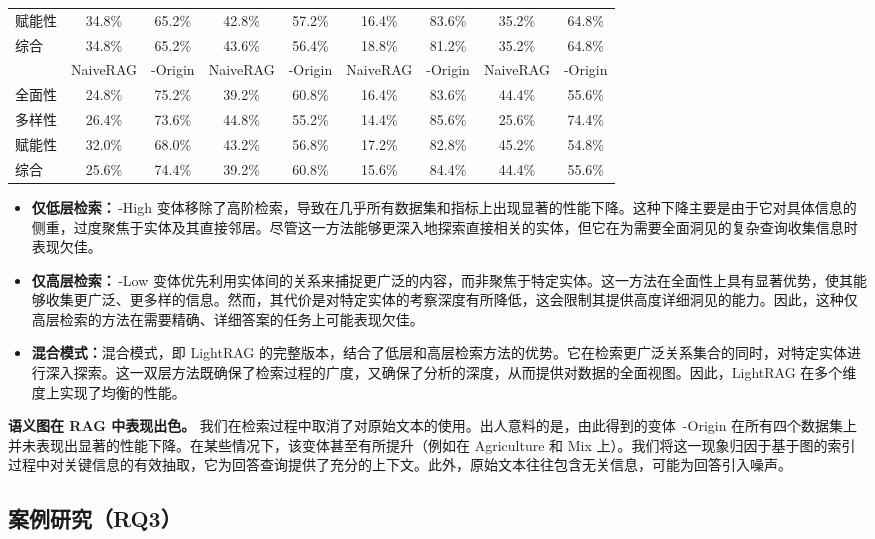 \documentclass[11pt,UTF8,fontset=fandol]{ctexart}
\begin{document}
\begin{table}[H]
\begin{tabular}{lcccccccc}
赋能性 & 34.8\% & 65.2\% & 42.8\% & 57.2\% & 16.4\% & 83.6\% & 35.2\% & 64.8\% \\
综合 & 34.8\% & 65.2\% & 43.6\% & 56.4\% & 18.8\% & 81.2\% & 35.2\% & 64.8\% \\
\midrule
& NaiveRAG & -Origin & NaiveRAG & -Origin & NaiveRAG & -Origin & NaiveRAG & -Origin \\
\midrule
全面性 & 24.8\% & 75.2\% & 39.2\% & 60.8\% & 16.4\% & 83.6\% & 44.4\% & 55.6\% \\
多样性 & 26.4\% & 73.6\% & 44.8\% & 55.2\% & 14.4\% & 85.6\% & 25.6\% & 74.4\% \\
赋能性 & 32.0\% & 68.0\% & 43.2\% & 56.8\% & 17.2\% & 82.8\% & 45.2\% & 54.8\% \\
综合 & 25.6\% & 74.4\% & 39.2\% & 60.8\% & 15.6\% & 84.4\% & 44.4\% & 55.6\% \\
\bottomrule
\end{tabular}
\end{table}

\begin{itemize}[leftmargin=1.5em]
\item \textbf{仅低层检索：}\,-High 变体移除了高阶检索，导致在几乎所有数据集和指标上出现显著的性能下降。这种下降主要是由于它对具体信息的侧重，过度聚焦于实体及其直接邻居。尽管这一方法能够更深入地探索直接相关的实体，但它在为需要全面洞见的复杂查询收集信息时表现欠佳。
\item \textbf{仅高层检索：}\,-Low 变体优先利用实体间的关系来捕捉更广泛的内容，而非聚焦于特定实体。这一方法在全面性上具有显著优势，使其能够收集更广泛、更多样的信息。然而，其代价是对特定实体的考察深度有所降低，这会限制其提供高度详细洞见的能力。因此，这种仅高层检索的方法在需要精确、详细答案的任务上可能表现欠佳。
\item \textbf{混合模式：}混合模式，即 LightRAG 的完整版本，结合了低层和高层检索方法的优势。它在检索更广泛关系集合的同时，对特定实体进行深入探索。这一双层方法既确保了检索过程的广度，又确保了分析的深度，从而提供对数据的全面视图。因此，LightRAG 在多个维度上实现了均衡的性能。
\end{itemize}

\textbf{语义图在 RAG 中表现出色。} 我们在检索过程中取消了对原始文本的使用。出人意料的是，由此得到的变体 \,-Origin 在所有四个数据集上并未表现出显著的性能下降。在某些情况下，该变体甚至有所提升（例如在 Agriculture 和 Mix 上）。我们将这一现象归因于基于图的索引过程中对关键信息的有效抽取，它为回答查询提供了充分的上下文。此外，原始文本往往包含无关信息，可能为回答引入噪声。

\subsection{案例研究（RQ3）}
\end{document}
